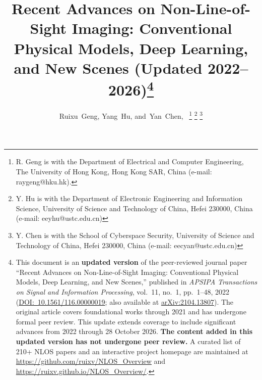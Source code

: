 \documentclass[journal]{IEEEtran}
\begin{document}
%
\title{Recent Advances on Non-Line-of-Sight Imaging: Conventional Physical Models, Deep Learning, and New Scenes (Updated 2022--2026)\thanks{This document is an \textbf{updated version} of the peer-reviewed journal paper ``Recent Advances on Non-Line-of-Sight Imaging: Conventional Physical Models, Deep Learning, and New Scenes,'' published in \emph{APSIPA Transactions on Signal and Information Processing}, vol.~11, no.~1, pp.~1--48, 2022 (\href{https://doi.org/10.1561/116.00000019}{DOI:~10.1561/116.00000019}; also available at \href{https://arxiv.org/pdf/2104.13807}{arXiv:2104.13807}). The original article covers foundational works through 2021 and has undergone formal peer review. This update extends coverage to include significant advances from 2022 through 28 October 2026. \textbf{The content added in this updated version has not undergone peer review.} A curated list of 210+ NLOS papers and an interactive project homepage are maintained at \url{https://github.com/ruixv/NLOS_Overview} and \url{https://ruixv.github.io/NLOS_Overview/}.}}
%
%
%

\author{Ruixu~Geng,
        Yang~Hu,
        and~Yan~Chen,~%
\thanks{R. Geng is with the Department of Electrical and Computer Engineering, The University of Hong Kong, Hong Kong SAR, China (e-mail: raygeng@hku.hk).}%
\thanks{Y. Hu is with the Department of Electronic Engineering and Information Science, University of Science and Technology of China, Hefei 230000, China (e-mail: eeyhu@ustc.edu.cn)}%
\thanks{Y. Chen is with the School of Cyberspace Security, University of Science and Technology of China, Hefei 230000, China (e-mail: eecyan@ustc.edu.cn)}%
} %
\end{document}
